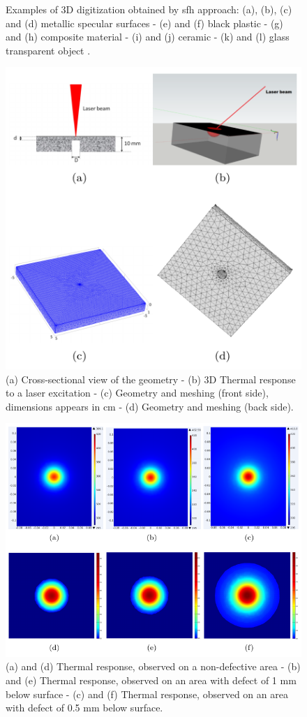 \documentclass[12pt]{spieman}
\begin{document}
\begin{spacing}{2}
\begin{figure}
	  \caption{Examples of 3D digitization obtained by \acs*{sfh} approach: (a), (b), (c) and (d) metallic specular surfaces \cite{bajard2013numerisation} - (e) and (f) black plastic - (g) and (h) composite material - (i) and (j) ceramic - (k) and (l) glass transparent object \cite{meriaudeau20113d}.}
  \label{fig:1}
\end{figure}

\newpage \begin{figure}\centering\includegraphics{Fig2}  
		\caption{(a) Cross-sectional view of the geometry - (b) 3D Thermal response to a laser 
	excitation - (c) Geometry and meshing (front side), dimensions appears in cm  - (d) 
	Geometry and meshing (back side).}
  \label{fig:2}
\end{figure}

\newpage \begin{figure}\centering\includegraphics{Fig3}  
	  \caption{(a) and (d) Thermal response, observed on a non-defective area - (b) and (e) 
	Thermal response, observed on an area with defect of 1 mm below surface - (c) and (f) 
	Thermal response, 
	observed on an area with defect of 0.5 mm below surface.}
	

\end{figure}
\end{spacing}
\end{document}
